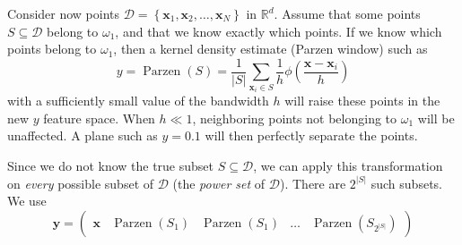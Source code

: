 \documentclass[12pt, a4paper]{article}
\newcommand{\R}{\mathbb{R}}
\newcommand{\D}{\mathcal{D}}
\newcommand{\vect}[1]{\bm{#1}}
\newcommand{\abs}[1]{\left\lvert#1\right\rvert}
\begin{document}
Consider now points $\D = \left\{ \vect{x}_1, \vect{x}_2, \dots, \vect{x}_N \right\}$ in $\R^d$.
Assume that some points $S \subseteq \D$ belong to $\omega_1$, and that we know exactly which points. 
If we know which points belong to  $\omega_1$, then a kernel density estimate  (Parzen window) such as
\begin{equation*}
	y  = \operatorname{Parzen}(S) = \frac{1}{\abs{S}}\sum_{\vect{x}_i \in S} \frac{1}{h} \phi \left( \frac{\vect{x} - \vect{x}_i}{h} \right)
\end{equation*}
with a sufficiently small value of the bandwidth $h$ will raise these points in the new $y$ feature space.
When $h \ll 1$, neighboring points not belonging to $\omega_1$ will be unaffected.
A plane such as $y = 0.1$ will then perfectly separate the points.

Since we do not know the true subset $S \subseteq \D$, we can apply this transformation on \emph{every} possible subset of $\D$ (the \emph{power set} of $\D$).
There are $2^{\abs{S}}$ such subsets.
We use
\begin{equation*}
	\vect{y} = 
	\begin{pmatrix}
	\vect{x} & \operatorname{Parzen}(S_1) & \operatorname{Parzen}(S_1) & \dots & \operatorname{Parzen}(S_{2^{\abs{S}}})
	\end{pmatrix}
\end{equation*}
\end{document}
